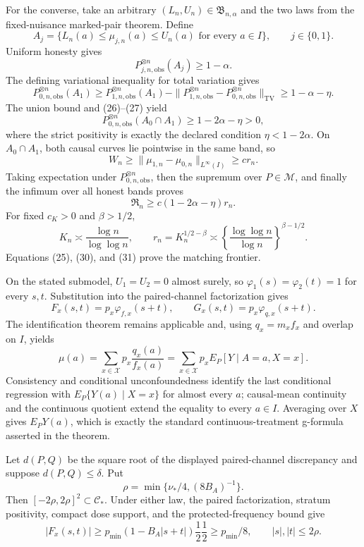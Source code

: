 For the converse, take an arbitrary \((L_n,U_n)\in\mathfrak B_{n,\alpha}\) and the two laws from the fixed-nuisance marked-pair theorem.  Define
\[
A_j=\{L_n(a)\le\mu_{j,n}(a)\le U_n(a)
\text{ for every }a\in I\},
\qquad j\in\{0,1\}.
\]
Uniform honesty gives
\[
P_{j,n,\mathrm{obs}}^{\otimes n}(A_j)\ge1-\alpha. \tag{26}
\]
The defining variational inequality for total variation gives
\[
P_{0,n,\mathrm{obs}}^{\otimes n}(A_1)
\ge P_{1,n,\mathrm{obs}}^{\otimes n}(A_1)
-\|P_{1,n,\mathrm{obs}}^{\otimes n}-P_{0,n,\mathrm{obs}}^{\otimes n}\|_{\mathrm{TV}}
\ge1-\alpha-\eta. \tag{27}
\]
The union bound and (26)--(27) yield
\[
P_{0,n,\mathrm{obs}}^{\otimes n}(A_0\cap A_1)
\ge1-2\alpha-\eta>0, \tag{28}
\]
where the strict positivity is exactly the declared condition \(\eta<1-2\alpha\).  On \(A_0\cap A_1\), both causal curves lie pointwise in the same band, so
\[
W_n\ge\|\mu_{1,n}-\mu_{0,n}\|_{L^\infty(I)}\ge cr_n. \tag{29}
\]
Taking expectation under \(P_{0,n,\mathrm{obs}}^{\otimes n}\), then the supremum over \(P\in\mathcal M\), and finally the infimum over all honest bands proves
\[
\mathfrak R_n\ge c(1-2\alpha-\eta)r_n. \tag{30}
\]
For fixed \(c_K>0\) and \(\beta>1/2\),
\[
K_n\asymp\frac{\log n}{\log\log n},
\qquad
r_n=K_n^{1/2-\beta}
\asymp\left\{\frac{\log\log n}{\log n}\right\}^{\beta-1/2}. \tag{31}
\]
Equations (25), (30), and (31) prove the matching frontier.

On the stated submodel, \(U_1=U_2=0\) almost surely, so \(\varphi_1(s)=\varphi_2(t)=1\) for every \(s,t\).  Substitution into the paired-channel factorization gives
\[
F_x(s,t)=p_x\varphi_{f,x}(s+t),
\qquad
G_x(s,t)=p_x\varphi_{q,x}(s+t).
\]
The identification theorem remains applicable and, using \(q_x=m_xf_x\) and overlap on \(I\), yields
\[
\mu(a)=\sum_{x\in\mathcal X}p_x\frac{q_x(a)}{f_x(a)}
=\sum_{x\in\mathcal X}p_xE_P[Y\mid A=a,X=x].
\]
Consistency and conditional unconfoundedness identify the last conditional regression with \(E_P\{Y(a)\mid X=x\}\) for almost every \(a\); causal-mean continuity and the continuous quotient extend the equality to every \(a\in I\).  Averaging over \(X\) gives \(E_PY(a)\), which is exactly the standard continuous-treatment g-formula asserted in the theorem.

Let \(d(P,Q)\) be the square root of the displayed paired-channel discrepancy and suppose \(d(P,Q)\le\delta\).  Put
\[
\rho=\min\{\nu_*/4,(8B_A)^{-1}\}.
\]
Then \([-2\rho,2\rho]^2\subset\mathcal C_*\).  Under either law, the paired factorization, stratum positivity, compact dose support, and the protected-frequency bound give
\[
|F_x(s,t)|
\ge p_{\min}\left(1-B_A|s+t|\right)\frac12\frac12
\ge p_{\min}/8,
\qquad |s|,|t|\le2\rho. \tag{32}
\]

